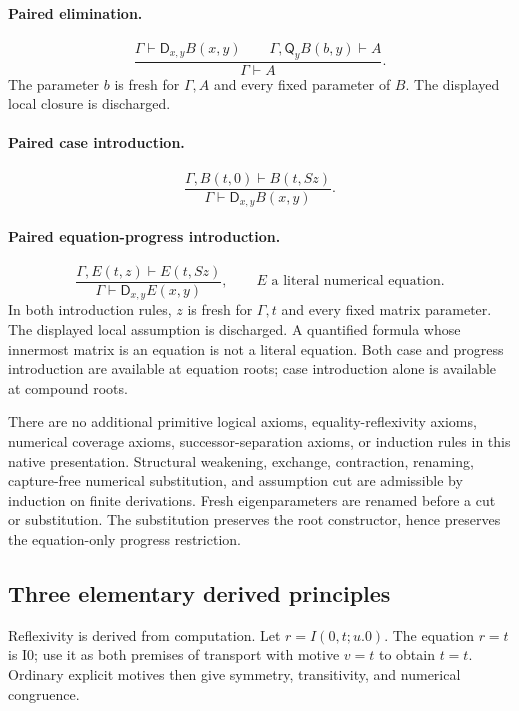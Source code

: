 \documentclass[11pt,letterpaper]{article}
\theoremstyle{definition}\newtheorem{definition}[theorem]{Definition}
\theoremstyle{remark}\newtheorem{remark}[theorem]{Remark}
\newcommand{\D}{\mathsf D}
\newcommand{\Q}{\mathsf Q}
\begin{document}
\paragraph{Paired elimination.}
\[
 \frac{\Gamma\vdash\D_{x,y}B(x,y)\qquad
       \Gamma,\Q_yB(b,y)\vdash A}
      {\Gamma\vdash A}.
 \tag{DE}
\]
The parameter $b$ is fresh for $\Gamma,A$ and every fixed parameter of $B$.
The displayed local closure is discharged.

\paragraph{Paired case introduction.}
\[
 \frac{\Gamma,B(t,0)\vdash B(t,Sz)}
      {\Gamma\vdash\D_{x,y}B(x,y)}.
 \tag{DI-case}
\]

\paragraph{Paired equation-progress introduction.}
\[
 \frac{\Gamma,E(t,z)\vdash E(t,Sz)}
      {\Gamma\vdash\D_{x,y}E(x,y)},
 \qquad E\text{ a literal numerical equation}.
 \tag{DI-progress}
\]
In both introduction rules, $z$ is fresh for $\Gamma,t$ and every fixed
matrix parameter. The displayed local assumption is discharged. A quantified
formula whose innermost matrix is an equation is not a literal equation.
Both case and progress introduction are available at equation roots;
case introduction alone is available at compound roots.

There are no additional primitive logical axioms, equality-reflexivity
axioms, numerical coverage axioms, successor-separation axioms, or induction
rules in this native presentation. Structural weakening, exchange,
contraction, renaming, capture-free numerical substitution, and assumption
cut are admissible by induction on finite derivations. Fresh eigenparameters
are renamed before a cut or substitution. The substitution preserves the
root constructor, hence preserves the equation-only progress restriction.

\subsection{Three elementary derived principles}

Reflexivity is derived from computation. Let $r=I(0,t;u.0)$. The equation
$r=t$ is I0; use it as both premises of transport with motive $v=t$ to
obtain $t=t$. Ordinary explicit motives then give symmetry, transitivity,
and numerical congruence.
\end{document}
